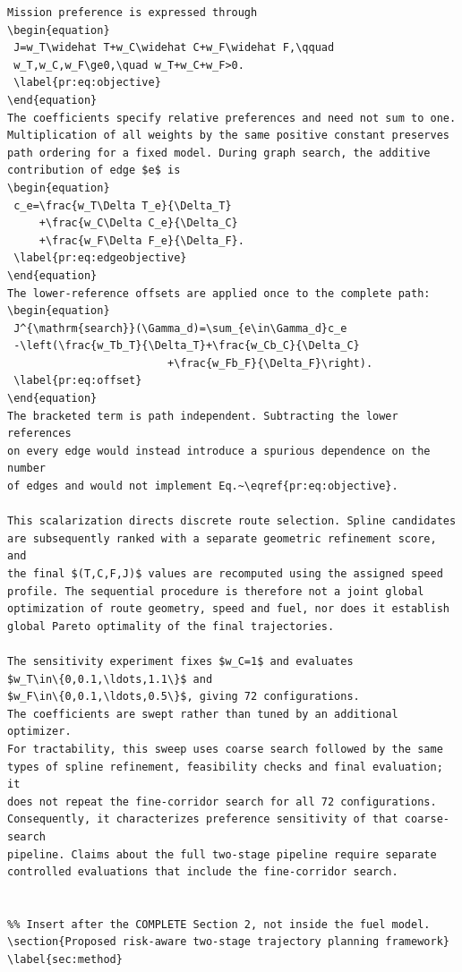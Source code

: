 \documentclass[12pt]{article}
\begin{document}
\begin{verbatim}
Mission preference is expressed through
\begin{equation}
 J=w_T\widehat T+w_C\widehat C+w_F\widehat F,\qquad
 w_T,w_C,w_F\ge0,\quad w_T+w_C+w_F>0.
 \label{pr:eq:objective}
\end{equation}
The coefficients specify relative preferences and need not sum to one.
Multiplication of all weights by the same positive constant preserves
path ordering for a fixed model. During graph search, the additive
contribution of edge $e$ is
\begin{equation}
 c_e=\frac{w_T\Delta T_e}{\Delta_T}
     +\frac{w_C\Delta C_e}{\Delta_C}
     +\frac{w_F\Delta F_e}{\Delta_F}.
 \label{pr:eq:edgeobjective}
\end{equation}
The lower-reference offsets are applied once to the complete path:
\begin{equation}
 J^{\mathrm{search}}(\Gamma_d)=\sum_{e\in\Gamma_d}c_e
 -\left(\frac{w_Tb_T}{\Delta_T}+\frac{w_Cb_C}{\Delta_C}
                         +\frac{w_Fb_F}{\Delta_F}\right).
 \label{pr:eq:offset}
\end{equation}
The bracketed term is path independent. Subtracting the lower references
on every edge would instead introduce a spurious dependence on the number
of edges and would not implement Eq.~\eqref{pr:eq:objective}.

This scalarization directs discrete route selection. Spline candidates
are subsequently ranked with a separate geometric refinement score, and
the final $(T,C,F,J)$ values are recomputed using the assigned speed
profile. The sequential procedure is therefore not a joint global
optimization of route geometry, speed and fuel, nor does it establish
global Pareto optimality of the final trajectories.

The sensitivity experiment fixes $w_C=1$ and evaluates
$w_T\in\{0,0.1,\ldots,1.1\}$ and
$w_F\in\{0,0.1,\ldots,0.5\}$, giving 72 configurations.
The coefficients are swept rather than tuned by an additional optimizer.
For tractability, this sweep uses coarse search followed by the same
types of spline refinement, feasibility checks and final evaluation; it
does not repeat the fine-corridor search for all 72 configurations.
Consequently, it characterizes preference sensitivity of that coarse-search
pipeline. Claims about the full two-stage pipeline require separate
controlled evaluations that include the fine-corridor search.


%% Insert after the COMPLETE Section 2, not inside the fuel model.
\section{Proposed risk-aware two-stage trajectory planning framework}
\label{sec:method}


\end{verbatim}
\end{document}
